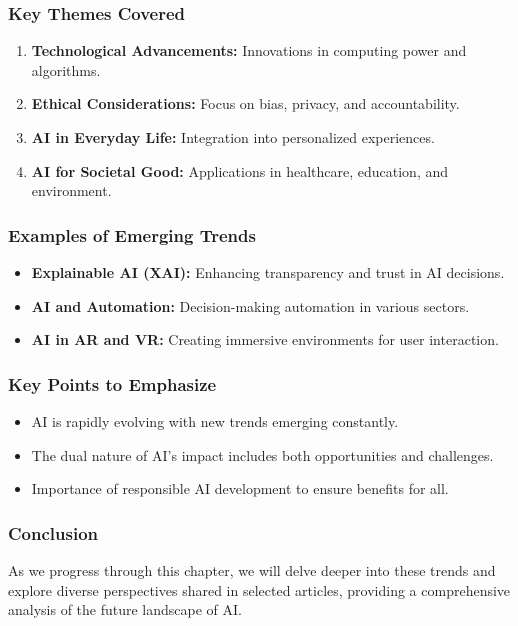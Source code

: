 \documentclass{beamer}
\begin{document}
\begin{frame}[fragile]
    \frametitle{Key Themes Covered}
    \begin{enumerate}
        \item \textbf{Technological Advancements:} Innovations in computing power and algorithms.
        \item \textbf{Ethical Considerations:} Focus on bias, privacy, and accountability.
        \item \textbf{AI in Everyday Life:} Integration into personalized experiences.
        \item \textbf{AI for Societal Good:} Applications in healthcare, education, and environment.
    \end{enumerate}
\end{frame}

\begin{frame}[fragile]
    \frametitle{Examples of Emerging Trends}
    \begin{itemize}
        \item \textbf{Explainable AI (XAI):} Enhancing transparency and trust in AI decisions.
        \item \textbf{AI and Automation:} Decision-making automation in various sectors.
        \item \textbf{AI in AR and VR:} Creating immersive environments for user interaction.
    \end{itemize}
\end{frame}

\begin{frame}[fragile]
    \frametitle{Key Points to Emphasize}
    \begin{itemize}
        \item AI is rapidly evolving with new trends emerging constantly.
        \item The dual nature of AI's impact includes both opportunities and challenges.
        \item Importance of responsible AI development to ensure benefits for all.
    \end{itemize}
\end{frame}

\begin{frame}[fragile]
    \frametitle{Conclusion}
    As we progress through this chapter, we will delve deeper into these trends and explore diverse perspectives shared in selected articles, providing a comprehensive analysis of the future landscape of AI.
\end{frame}
\end{document}
